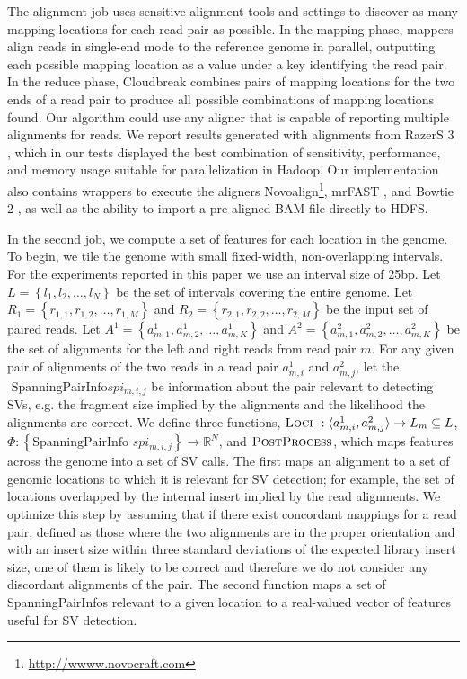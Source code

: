 \documentclass[11pt]{article}
\begin{document}
The alignment job uses sensitive alignment tools and settings to discover as many mapping locations for each read pair as possible. In the mapping phase, mappers align reads in single-end mode to the reference genome in parallel, outputting each possible mapping location as a value under a key identifying the read pair. In the reduce phase, Cloudbreak combines pairs of mapping locations for the two ends of a read pair to produce all possible combinations of mapping locations found. Our algorithm could use any aligner that is capable of reporting multiple alignments for reads. We report results generated with alignments from RazerS 3 \autocite{Weese:2012by}, which in our tests displayed the best combination of sensitivity, performance, and memory usage suitable for parallelization in Hadoop. Our implementation also contains wrappers to execute the aligners Novoalign\footnote{\url{http://wwww.novocraft.com}}, mrFAST \autocite{Alkan:2009cr}, and Bowtie 2 \autocite{Langmead:2012jh}, as well as the ability to import a pre-aligned BAM file directly to HDFS.

In the second job, we compute a set of features for each location in the genome. To begin, we tile the genome with small fixed-width, non-overlapping intervals. For the experiments reported in this paper we use an interval size of 25bp. Let $L = \left\{l_1,l_2,\ldots,l_N\right\}$ be the set of intervals covering the entire genome. Let $R_1 = \left\{r_{1,1},r_{1,2},\ldots,r_{1,M}\right\}$ and $R_2 = \left\{r_{2,1},r_{2,2},\ldots,r_{2,M}\right\}$ be the input set of paired reads. Let $A^1 = \left\{a^{1}_{m,1},a^{1}_{m,2},\ldots,a^{1}_{m,K}\right\}$ and $A^2 = \left\{a^{2}_{m,1},a^{2}_{m,2},\ldots,a^{2}_{m,K}\right\}$ be the set of alignments for the left and right reads from read pair $m$. For any given pair of alignments of the two reads in a read pair $a^{1}_{m,i}$ and $a^{2}_{m,j}$, let the $\textrm{ SpanningPairInfo} spi_{m,i,j}$ be information about the pair relevant to detecting SVs, e.g. the fragment size implied by the alignments and the likelihood the alignments are correct. We define three functions, $\textsc{Loci } : \langle a^{1}_{m,i},a^{2}_{m,j} \rangle \rightarrow L_m \subseteq L$, $\Phi : \left\{\textrm{SpanningPairInfo }spi_{m,i,j}\right\} \rightarrow \mathbb{R}^N$, and $\textsc{PostProcess}$, which maps features across the genome into a set of SV calls. The first maps an alignment to a set of genomic locations to which it is relevant for SV detection; for example, the set of locations overlapped by the internal insert implied by the read alignments. We optimize this step by assuming that if there exist concordant mappings for a read pair, defined as those where the two alignments are in the proper orientation and with an insert size within three standard deviations of the expected library insert size, one of them is likely to be correct and therefore we do not consider any discordant alignments of the pair. The second function maps a set of SpanningPairInfos relevant to a given location to a real-valued vector of features useful for SV detection. 
\end{document}
